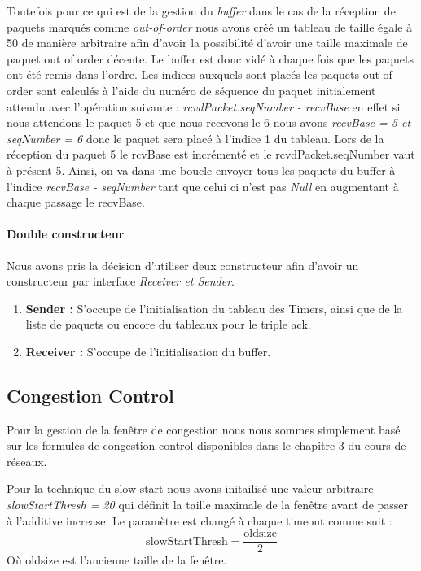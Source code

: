 \documentclass[../rapport.tex]{subfiles}
\begin{document}
	Toutefois pour ce qui est de la gestion du \textit{buffer} dans le cas de la réception de
	paquets marqués comme \textit{out-of-order} nous avons créé un tableau de taille égale
	à 50 de manière arbitraire afin d'avoir la possibilité d'avoir une taille maximale
	de paquet out of order décente. Le buffer est donc vidé à chaque fois que les paquets ont été
	remis dans l'ordre. Les indices auxquels sont placés les paquets out-of-order sont calculés
	à l'aide du numéro de séquence du paquet initialement attendu avec l'opération suivante :
	\textit{rcvdPacket.seqNumber - recvBase} en effet si nous attendons le paquet 5 et que nous
	recevons le 6 nous avons \textit{recvBase = 5 et seqNumber = 6} donc le paquet sera placé
	à l'indice 1 du tableau. Lors de la réception du paquet 5 le rcvBase est incrémenté et le
	rcvdPacket.seqNumber vaut à présent 5. Ainsi, on va dans une boucle envoyer tous les paquets
	du buffer à l'indice \textit{recvBase - seqNumber} tant que celui ci n'est pas \textit{Null}
	en augmentant à chaque passage le recvBase. 

	\paragraph{Double constructeur} Nous avons pris la décision d'utiliser deux constructeur
	afin d'avoir un constructeur par interface \textit{Receiver et Sender}.

		\begin{enumerate}
			\item\textbf{Sender : } S'occupe de l'initialisation du tableau des Timers, ainsi que
				de la liste de paquets ou encore du tableaux pour le triple ack.
			\item\textbf{Receiver : } S'occupe de l'initialisation du buffer. 
		\end{enumerate}
		
\newpage

\subsection{Congestion Control} Pour la gestion de la fenêtre de congestion nous nous sommes 
simplement basé sur les formules de congestion control disponibles dans le chapitre 3 du cours 
de réseaux. 

\medskip

Pour la technique du slow start nous avons initailisé une valeur arbitraire 
\textit{slowStartThresh = 20 } qui définit la taille maximale de la fenêtre avant de passer à 
l'additive increase. Le paramètre est changé à chaque timeout comme suit : 
\[ \text{slowStartThresh} = \frac{\text{oldsize}}{2} \]
Où oldsize est l'ancienne taille de la fenêtre. 
\end{document}
